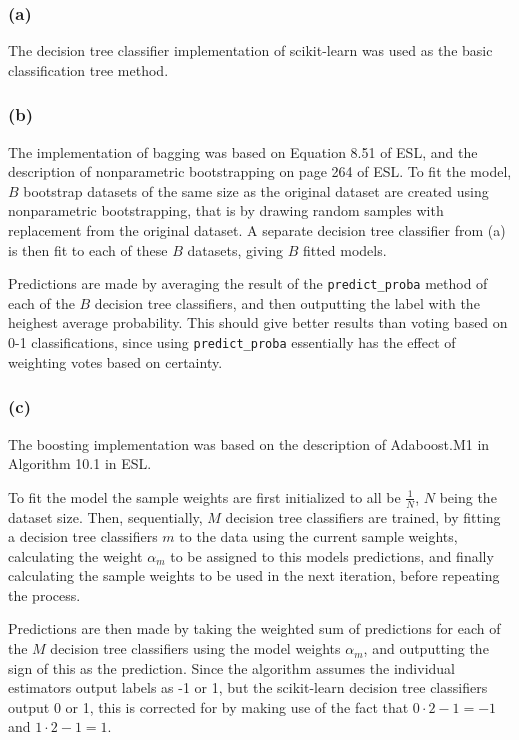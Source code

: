 \documentclass[a4paper, 12pt]{article}
\begin{document}

\subsubsection{(a)}

The decision tree classifier implementation of scikit-learn was used as the basic classification tree method.

\subsubsection{(b)}

The implementation of bagging was based on Equation 8.51 of ESL, and the description of nonparametric bootstrapping on page 264 of ESL. To fit the model, $B$ bootstrap datasets of the same size as the original dataset are created using nonparametric bootstrapping, that is by drawing random samples with replacement from the original dataset. A separate decision tree classifier from (a) is then fit to each of these $B$ datasets, giving $B$ fitted models.

Predictions are made by averaging the result of the \texttt{predict\_proba} method of each of the $B$ decision tree classifiers, and then outputting the label with the heighest average probability. This should give better results than voting based on 0-1 classifications, since using \texttt{predict\_proba} essentially has the effect of weighting votes based on certainty.	

\subsubsection{(c)}

The boosting implementation was based on the description of Adaboost.M1 in Algorithm 10.1 in ESL.

To fit the model the sample weights are first initialized to all be $\frac{1}{N}$, $N$ being the dataset size. Then, sequentially, $M$ decision tree classifiers are trained, by fitting a decision tree classifiers $m$ to the data using the current sample weights, calculating the weight $\alpha_m$ to be assigned to this models predictions, and finally calculating the sample weights to be used in the next iteration, before repeating the process.

Predictions are then made by taking the weighted sum of predictions for each of the $M$ decision tree classifiers using the model weights $\alpha_m$, and outputting the sign of this as the prediction. Since the algorithm assumes the individual estimators output labels as -1 or 1, but the scikit-learn decision tree classifiers output 0 or 1, this is corrected for by making use of the fact that $0 \cdot 2 - 1 = -1$ and $1 \cdot 2 - 1 = 1$.
\end{document}
